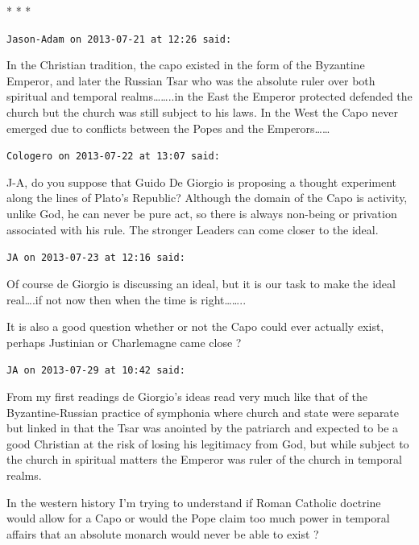 
\begin{center}* * *\end{center}

\begin{footnotesize}\begin{sffamily}



\texttt{Jason-Adam on 2013-07-21 at 12:26 said: }

In the Christian tradition, the capo existed in the form of the Byzantine Emperor, and later the Russian Tsar who was the absolute ruler over both spiritual and temporal realms……..in the East the Emperor protected defended the church but the church was still subject to his laws. In the West the Capo never emerged due to conflicts between the Popes and the Emperors……


\hfill

\texttt{Cologero on 2013-07-22 at 13:07 said: }

J-A, do you suppose that Guido De Giorgio is proposing a thought experiment along the lines of Plato's Republic? Although the domain of the Capo is activity, unlike God, he can never be pure act, so there is always non-being or privation associated with his rule. The stronger Leaders can come closer to the ideal.


\hfill

\texttt{JA on 2013-07-23 at 12:16 said: }

Of course de Giorgio is discussing an ideal, but it is our task to make the ideal real….if not now then when the time is right……..

It is also a good question whether or not the Capo could ever actually exist, perhaps Justinian or Charlemagne came close ?


\hfill

\texttt{JA on 2013-07-29 at 10:42 said: }

From my first readings de Giorgio's ideas read very much like that of the Byzantine-Russian practice of symphonia where church and state were separate but linked in that the Tsar was anointed by the patriarch and expected to be a good Christian at the risk of losing his legitimacy from God, but while subject to the church in spiritual matters the Emperor was ruler of the church in temporal realms. 

In the western history I'm trying to understand if Roman Catholic doctrine would allow for a Capo or would the Pope claim too much power in temporal affairs that an absolute monarch would never be able to exist ?



\end{sffamily}
\end{footnotesize}
